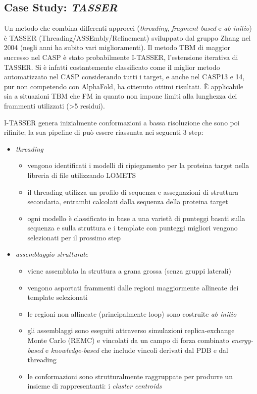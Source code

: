 {{}

\subsection{Case Study: \textit{TASSER}}

Un metodo che combina differenti approcci (\textit{threading}, \textit{fragment-based} e \textit{ab initio}) è TASSER (Threading/ASSEmbly/Refinement) sviluppato dal gruppo Zhang nel 2004 (negli anni ha subito vari miglioramenti). Il metodo TBM di maggior successo nel CASP è stato probabilmente I-TASSER, l'estensione iterativa di TASSER. Si è infatti costantemente classificato come il miglior metodo automatizzato nel CASP\supercite{pearce2021deep} considerando tutti i target, e anche nel CASP13 e 14, pur non competendo con AlphaFold, ha ottenuto ottimi risultati. È applicabile sia a situazioni TBM che FM in quanto non impone limiti alla lunghezza dei frammenti utilizzati (>5 residui).

\par I-TASSER genera inizialmente conformazioni a bassa risoluzione che sono poi rifinite; la sua pipeline di può essere riassunta nei seguenti 3 step\supercite{abbass2020enhancing}:

\begin{itemize}
	\item \textit{threading}
	\begin{itemize}
		\item vengono identificati i modelli di ripiegamento per la proteina target nella libreria di file utilizzando LOMETS
		\item il threading utilizza un profilo di sequenza e assegnazioni di struttura secondaria, entrambi calcolati dalla sequenza della proteina target
		\item ogni modello è classificato in base a una varietà di punteggi basati sulla sequenza e sulla struttura e i template con punteggi migliori vengono selezionati per il prossimo step
	\end{itemize}
	
	\item \textit{assemblaggio strutturale}
	
	\begin{itemize}
		\item viene assemblata la struttura a grana grossa (senza gruppi laterali)
		\item vengono asportati frammenti dalle regioni maggiormente allineate dei template selezionati
		\item le regioni non allineate (principalmente loop) sono costruite \textit{ab initio}
		\item gli assemblaggi sono eseguiti attraverso simulazioni replica-exchange Monte Carlo (REMC) e vincolati da un campo di forza combinato \textit{energy-based} e \textit{knowledge-based} che include vincoli derivati dal PDB e dal threading 
		\item le conformazioni sono strutturalmente raggruppate per produrre un insieme di rappresentanti: i \textit{cluster centroids}
	\end{itemize}
	

\end{itemize}}
